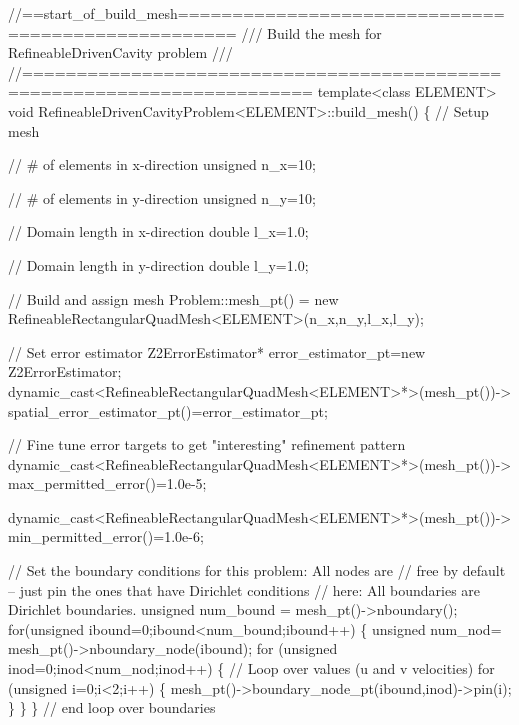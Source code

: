  
\begin{DoxyCodeInclude}
\textcolor{comment}{//==start\_of\_build\_mesh===================================================}
\textcolor{comment}{/// Build the mesh for RefineableDrivenCavity problem }
\textcolor{comment}{}\textcolor{comment}{///}
\textcolor{comment}{}\textcolor{comment}{//========================================================================}
\textcolor{keyword}{template}<\textcolor{keyword}{class} ELEMENT>
\textcolor{keywordtype}{void} RefineableDrivenCavityProblem<ELEMENT>::build\_mesh()
\{ 
 \textcolor{comment}{// Setup mesh}

 \textcolor{comment}{// # of elements in x-direction}
 \textcolor{keywordtype}{unsigned} n\_x=10;

 \textcolor{comment}{// # of elements in y-direction}
 \textcolor{keywordtype}{unsigned} n\_y=10;

 \textcolor{comment}{// Domain length in x-direction}
 \textcolor{keywordtype}{double} l\_x=1.0;

 \textcolor{comment}{// Domain length in y-direction}
 \textcolor{keywordtype}{double} l\_y=1.0;

 \textcolor{comment}{// Build and assign mesh}
 Problem::mesh\_pt() = 
  \textcolor{keyword}{new} RefineableRectangularQuadMesh<ELEMENT>(n\_x,n\_y,l\_x,l\_y);

 \textcolor{comment}{// Set error estimator}
 Z2ErrorEstimator* error\_estimator\_pt=\textcolor{keyword}{new} Z2ErrorEstimator;
 \textcolor{keyword}{dynamic\_cast<}RefineableRectangularQuadMesh<ELEMENT>*\textcolor{keyword}{>}(mesh\_pt())->
  spatial\_error\_estimator\_pt()=error\_estimator\_pt;
 
 \textcolor{comment}{// Fine tune error targets to get "interesting" refinement pattern}
 \textcolor{keyword}{dynamic\_cast<}RefineableRectangularQuadMesh<ELEMENT>*\textcolor{keyword}{>}(mesh\_pt())->
  max\_permitted\_error()=1.0e-5;
 
 \textcolor{keyword}{dynamic\_cast<}RefineableRectangularQuadMesh<ELEMENT>*\textcolor{keyword}{>}(mesh\_pt())->
  min\_permitted\_error()=1.0e-6;
 
 \textcolor{comment}{// Set the boundary conditions for this problem: All nodes are}
 \textcolor{comment}{// free by default -- just pin the ones that have Dirichlet conditions}
 \textcolor{comment}{// here: All boundaries are Dirichlet boundaries.}
 \textcolor{keywordtype}{unsigned} num\_bound = mesh\_pt()->nboundary();
 \textcolor{keywordflow}{for}(\textcolor{keywordtype}{unsigned} ibound=0;ibound<num\_bound;ibound++)
  \{
   \textcolor{keywordtype}{unsigned} num\_nod= mesh\_pt()->nboundary\_node(ibound);
   \textcolor{keywordflow}{for} (\textcolor{keywordtype}{unsigned} inod=0;inod<num\_nod;inod++)
    \{
     \textcolor{comment}{// Loop over values (u and v velocities)}
     \textcolor{keywordflow}{for} (\textcolor{keywordtype}{unsigned} i=0;i<2;i++)
      \{
       mesh\_pt()->boundary\_node\_pt(ibound,inod)->pin(i); 
      \}
    \}
  \} \textcolor{comment}{// end loop over boundaries}


\end{DoxyCodeInclude}
